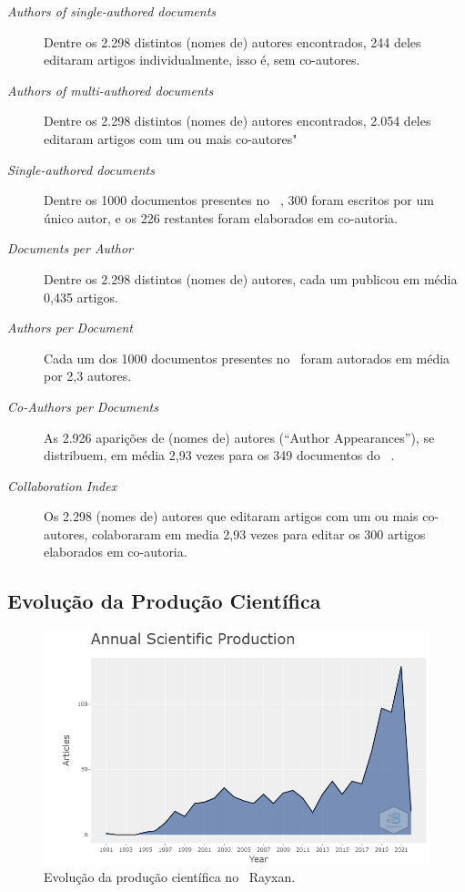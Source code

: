\begin{description}
    \item [\textit{Authors of single-authored documents}] Dentre os 2.298 distintos (nomes de) autores encontrados, 244 deles editaram artigos individualmente, isso é, sem co-autores.
    \item [\textit{Authors of multi-authored documents}] Dentre os 2.298 distintos (nomes de) autores encontrados, 2.054 deles editaram artigos com um ou mais co-autores"
    \item [\textit{Single-authored documents}] Dentre os 1000 documentos presentes no \dataset\  , 300 foram escritos por um único autor, e os 226 restantes foram elaborados em co-autoria.
    \item [\textit{Documents per Author}] Dentre os 2.298 distintos (nomes de) autores, cada um publicou em média 0,435 artigos.
    \item [\textit{Authors per Document}] Cada um dos 1000 documentos presentes no \dataset\  foram autorados em média por  2,3 autores.
    \item [\textit{Co-Authors per Documents}] As 2.926 aparições de (nomes de) autores (``Author Appearances''), se distribuem, em média 2,93 vezes para os 349 documentos do \dataset\ .
    \item [\textit{Collaboration Index}] Os 2.298 (nomes de) autores que editaram artigos com um ou mais co-autores, colaboraram em media 2,93 vezes para editar os 300 artigos elaborados em co-autoria.
\end{description}

\subsection{Evolução da Produção Científica}

\begin{figure}
    \centering
    \includegraphics[width=1\textwidth]{experiments/Rayxan/PesqBibliogr/ComputacaoQuantica/WoS-20220206/AnnualScientific.png}
    \caption{Evolução da produção científica no \dataset\   Rayxan.}
    \label{fig:evol:anual:Rayxan}
\end{figure}

